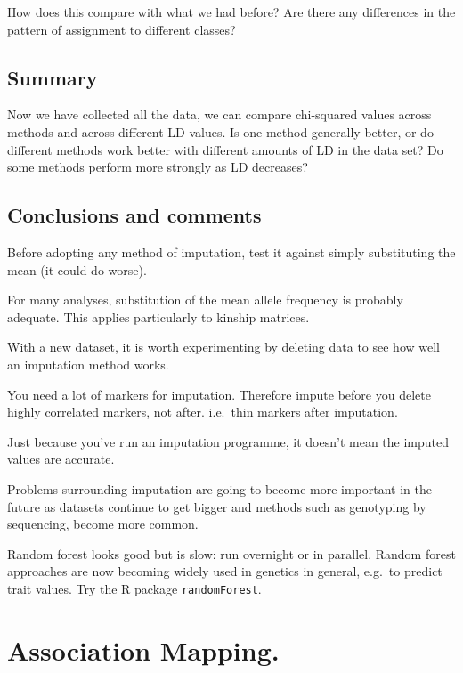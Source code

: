 \documentclass[
]{book}
\makeatletter
\newenvironment{kframe}{%
\medskip{}
\setlength{\fboxsep}{.8em}
 \def\at@end@of@kframe{}%
 \ifinner\ifhmode%
  \def\at@end@of@kframe{\end{minipage}}%
  \begin{minipage}{\columnwidth}%
 \fi\fi%
 \def\FrameCommand##1{\hskip\@totalleftmargin \hskip-\fboxsep
 \colorbox{shadecolor}{##1}\hskip-\fboxsep
     \hskip-\linewidth \hskip-\@totalleftmargin \hskip\columnwidth}%
 \MakeFramed {\advance\hsize-\width
   \@totalleftmargin\z@ \linewidth\hsize
   \@setminipage}}%
 {\par\unskip\endMakeFramed%
 \at@end@of@kframe}
\newenvironment{rmdblock}[1]
  {
  \begin{itemize}
  \renewcommand{\labelitemi}{
    \raisebox{-.7\height}[0pt][0pt]{
      {\setkeys{Gin}{width=3em,keepaspectratio}\texttt{[image: images/\#1]}}
    }
  }
  \setlength{\fboxsep}{1em}
  \begin{kframe}
  \item
  }
  {
  \end{kframe}
  \end{itemize}
  }
\newenvironment{rmdquiz}
  {\begin{rmdblock}{quiz}}
  {\end{rmdblock}}
\makeatother
\begin{document}
How does this compare with what we had before? Are there any differences in the pattern of assignment to different classes?

\hypertarget{summary-1}{%
\section{Summary}\label{summary-1}}

\begin{rmdquiz}
Now we have collected all the data, we can compare chi-squared values across methods and across different LD values. Is one method generally better, or do different methods work better with different amounts of LD in the data set? Do some methods perform more strongly as LD decreases?
\end{rmdquiz}

\hypertarget{conclusions-and-comments}{%
\section{Conclusions and comments}\label{conclusions-and-comments}}

Before adopting any method of imputation, test it against simply substituting the mean (it could do worse).

For many analyses, substitution of the mean allele frequency is probably adequate. This applies particularly to kinship matrices.

With a new dataset, it is worth experimenting by deleting data to see how well an imputation method works.

You need a lot of markers for imputation. Therefore impute before you delete highly correlated markers, not after. i.e.~thin markers after imputation.

Just because you've run an imputation programme, it doesn't mean the imputed values are accurate.

Problems surrounding imputation are going to become more important in the future as datasets continue to get bigger and methods such as genotyping by sequencing, become more common.

Random forest looks good but is slow: run overnight or in parallel. Random forest approaches are now becoming widely used in genetics in general, e.g.~to predict trait values. Try the R package \texttt{randomForest}.

\hypertarget{Association-mapping}{%
\chapter{Association Mapping.}\label{Association-mapping}}
\end{document}
